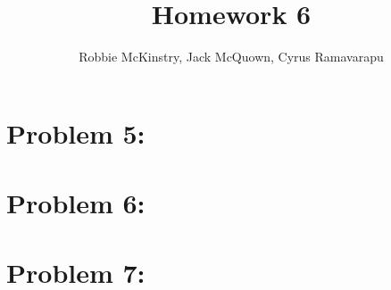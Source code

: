 \documentclass[12pt]{article}
\begin{document}
\title{Homework 6}
\author{Robbie McKinstry, Jack McQuown, Cyrus Ramavarapu}
\renewcommand{\today}{15 September 2016}
\renewcommand{\baselinestretch}{1.5}
\maketitle

\section*{Problem 5: }
\section*{Problem 6: }
\section*{Problem 7: }
\end{document}
